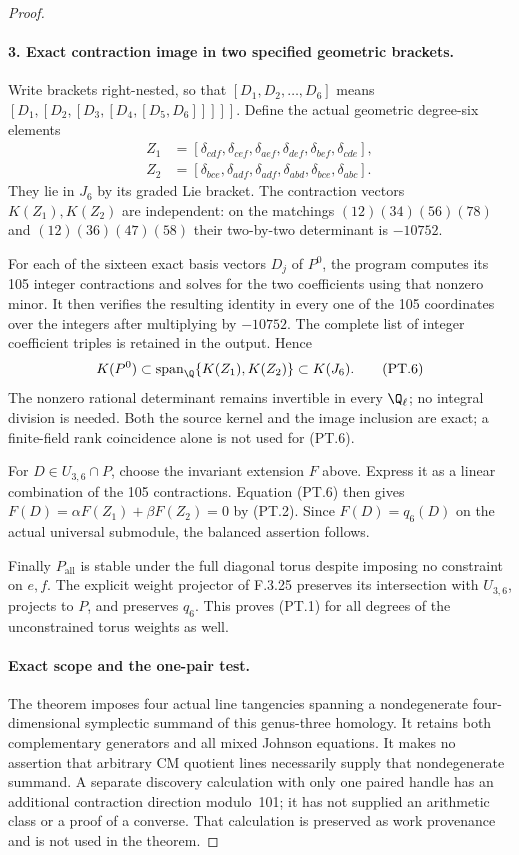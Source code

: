 \begin{proof}
\paragraph{3. Exact contraction image in two specified geometric brackets.}
Write brackets right-nested, so that
$[D_1,D_2,\ldots,D_6]$ means
$[D_1,[D_2,[D_3,[D_4,[D_5,D_6]]]]]$.
Define the actual geometric degree-six elements
\[
\begin{split}
 Z_1&=[\delta_{cdf},\delta_{cef},\delta_{aef},
          \delta_{def},\delta_{bef},\delta_{cde}],\\
 Z_2&=[\delta_{bce},\delta_{adf},\delta_{adf},
          \delta_{abd},\delta_{bce},\delta_{abc}].
\end{split}                                               \tag{PT.5}
\]
They lie in $J_6$ by its graded Lie bracket.
The contraction vectors $K(Z_1),K(Z_2)$ are
independent: on the matchings
$(12)(34)(56)(78)$ and $(12)(36)(47)(58)$
their two-by-two determinant is $-10752$.

For each of the sixteen exact basis vectors
$D_j$ of $P^0$, the program computes its
105 integer contractions and solves for the
two coefficients using that nonzero minor.
It then verifies the resulting identity in
every one of the 105 coordinates over the
integers after multiplying by $-10752$.
The complete list of integer coefficient
triples is retained in the output. Hence
\[
       K(P^0)\subset\operatorname{span}_{\Q}
                         \{K(Z_1),K(Z_2)\}\subset K(J_6).
                                                               \tag{PT.6}
\]
The nonzero rational determinant remains invertible
in every $\Q_\ell$; no integral division is needed.
Both the source kernel and the image inclusion
are exact; a finite-field rank coincidence
alone is not used for (PT.6).

For $D\in U_{3,6}\cap P$, choose the invariant
extension $F$ above. Express it as a linear
combination of the 105 contractions. Equation
(PT.6) then gives
$F(D)=\alpha F(Z_1)+\beta F(Z_2)=0$
by (PT.2). Since $F(D)=q_6(D)$ on the actual
universal submodule, the balanced assertion follows.

Finally $P_{\mathrm{all}}$ is stable under the
full diagonal torus despite imposing no
constraint on $e,f$. The explicit weight
projector of F.3.25 preserves its intersection
with $U_{3,6}$, projects to $P$, and preserves
$q_6$. This proves (PT.1) for all degrees of
the unconstrained torus weights as well.

\paragraph{Exact scope and the one-pair test.}
The theorem imposes four actual line tangencies
spanning a nondegenerate four-dimensional
symplectic summand of this genus-three homology.
It retains both complementary generators and
all mixed Johnson equations. It makes no
assertion that arbitrary CM quotient lines
necessarily supply that nondegenerate summand.
A separate discovery calculation with only
one paired handle has an additional contraction
direction modulo~101; it has not supplied an
arithmetic class or a proof of a converse.
That calculation is preserved as work provenance
and is not used in the theorem.

\end{proof}
